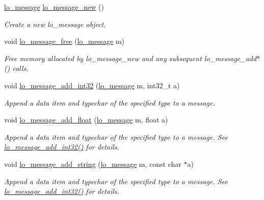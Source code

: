 \begin{CompactItemize}
\hyperlink{lo__types_8h_d126083c98d941f00eb72d1690b38d63}{lo\_\-message} \hyperlink{group__liblolowlevel_g2cce2e97452e3e9d6b5d3af33bb1d153}{lo\_\-message\_\-new} ()
\begin{CompactList}\small\item\em Create a new lo\_\-message object. \item\end{CompactList}\item 
void \hyperlink{group__liblolowlevel_g93d3687e77ae20167b82830c917a3e50}{lo\_\-message\_\-free} (\hyperlink{lo__types_8h_d126083c98d941f00eb72d1690b38d63}{lo\_\-message} m)
\begin{CompactList}\small\item\em Free memory allocated by lo\_\-message\_\-new and any subsequent lo\_\-message\_\-add$\ast$() calls. \item\end{CompactList}\item 
void \hyperlink{group__liblolowlevel_g31ac1e4c0ec6c61f665ce3f9bbdc53c3}{lo\_\-message\_\-add\_\-int32} (\hyperlink{lo__types_8h_d126083c98d941f00eb72d1690b38d63}{lo\_\-message} m, int32\_\-t a)
\begin{CompactList}\small\item\em Append a data item and typechar of the specified type to a message. \item\end{CompactList}\item 
void \hyperlink{group__liblolowlevel_g4704d1b80cb0fd005a1310f57ca46b00}{lo\_\-message\_\-add\_\-float} (\hyperlink{lo__types_8h_d126083c98d941f00eb72d1690b38d63}{lo\_\-message} m, float a)
\begin{CompactList}\small\item\em Append a data item and typechar of the specified type to a message. See \hyperlink{group__liblolowlevel_g31ac1e4c0ec6c61f665ce3f9bbdc53c3}{lo\_\-message\_\-add\_\-int32()} for details. \item\end{CompactList}\item 
void \hyperlink{group__liblolowlevel_g79458d53ab8f13ce3369b764d094d3c4}{lo\_\-message\_\-add\_\-string} (\hyperlink{lo__types_8h_d126083c98d941f00eb72d1690b38d63}{lo\_\-message} m, const char $\ast$a)
\begin{CompactList}\small\item\em Append a data item and typechar of the specified type to a message. See \hyperlink{group__liblolowlevel_g31ac1e4c0ec6c61f665ce3f9bbdc53c3}{lo\_\-message\_\-add\_\-int32()} for details. \item\end{CompactList}\item 

\end{CompactItemize}
